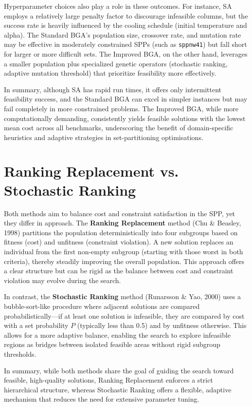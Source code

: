 \documentclass[12pt]{article}
\begin{document}
Hyperparameter choices also play a role in these outcomes. For instance, SA employs a relatively large penalty factor to discourage infeasible columns, but the success rate is heavily influenced by the cooling schedule (initial temperature and alpha). The Standard BGA’s population size, crossover rate, and mutation rate may be effective in moderately constrained SPPs (such as \texttt{sppnw41}) but fall short for larger or more difficult sets. The Improved BGA, on the other hand, leverages a smaller population plus specialized genetic operators (stochastic ranking, adaptive mutation threshold) that prioritize feasibility more effectively.

In summary, although SA has rapid run times, it offers only intermittent feasibility success, and the Standard BGA can excel in simpler instances but may fail completely in more constrained problems. The Improved BGA, while more computationally demanding, consistently yields feasible solutions with the lowest mean cost across all benchmarks, underscoring the benefit of domain-specific heuristics and adaptive strategies in set-partitioning optimisations.

\section{Ranking Replacement vs. Stochastic Ranking}
\label{sec:ranking}
Both methods aim to balance cost and constraint satisfaction in the SPP, yet they differ in approach. The \textbf{Ranking Replacement} method (Chu \& Beasley, 1998) partitions the population deterministically into four subgroups based on fitness (cost) and unfitness (constraint violation). A new solution replaces an individual from the first non-empty subgroup (starting with those worst in both criteria), thereby steadily improving the overall population. This approach offers a clear structure but can be rigid as the balance between cost and constraint violation may evolve during the search.

In contrast, the \textbf{Stochastic Ranking} method (Runarsson \& Yao, 2000) uses a bubble-sort-like procedure where adjacent solutions are compared probabilistically—if at least one solution is infeasible, they are compared by cost with a set probability \(P\) (typically less than 0.5) and by unfitness otherwise. This allows for a more adaptive balance, enabling the search to explore infeasible regions as bridges between isolated feasible areas without rigid subgroup thresholds.

In summary, while both methods share the goal of guiding the search toward feasible, high-quality solutions, Ranking Replacement enforces a strict hierarchical structure, whereas Stochastic Ranking offers a flexible, adaptive mechanism that reduces the need for extensive parameter tuning.
\end{document}
